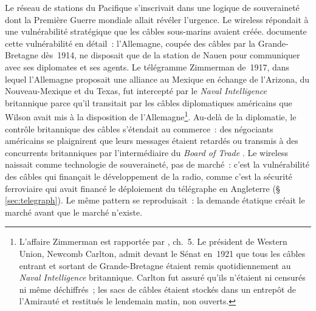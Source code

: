 %
Le réseau de stations du Pacifique s'inscrivait dans une logique de souveraineté dont la Première Guerre mondiale allait révéler l'urgence. Le wireless répondait à une vulnérabilité stratégique que les câbles sous-marins avaient créée. \textcite{aitken_continuous_1985} documente cette vulnérabilité en détail~: l'Allemagne, coupée des câbles par la Grande-Bretagne dès~1914, ne disposait que de la station de Nauen pour communiquer avec ses diplomates et ses agents. Le télégramme Zimmerman de~1917, dans lequel l'Allemagne proposait une alliance au Mexique en échange de l'Arizona, du Nouveau-Mexique et du Texas, fut intercepté par le \emph{Naval Intelligence} britannique parce qu'il transitait par les câbles diplomatiques américains que Wilson avait mis à la disposition de l'Allemagne\footnote{L'affaire Zimmerman est rapportée par \textcite{aitken_continuous_1985}, ch.~5. Le président de Western Union, Newcomb Carlton, admit devant le Sénat en~1921 que tous les câbles entrant et sortant de Grande-Bretagne étaient remis quotidiennement au \emph{Naval Intelligence} britannique. Carlton fut assuré qu'ils n'étaient \og ni censurés ni même déchiffrés\fg{}~; les sacs de câbles étaient \og stockés dans un entrepôt de l'Amirauté et restitués le lendemain matin, non ouverts\fg{}.}. Au-delà de la diplomatie, le contrôle britannique des câbles s'étendait au commerce~: des négociants américains se plaignirent que leurs messages étaient retardés ou transmis à des concurrents britanniques par l'intermédiaire du \emph{Board of Trade} \parencite{aitken_continuous_1985}. Le wireless naissait comme technologie de souveraineté, pas de marché~: c'est la vulnérabilité des câbles qui finançait le développement de la radio, comme c'est la sécurité ferroviaire qui avait financé le déploiement du télégraphe en Angleterre (§\,\ref{sec:telegraph}). Le même pattern se reproduisait~: la demande étatique créait le marché avant que le marché n'existe.



